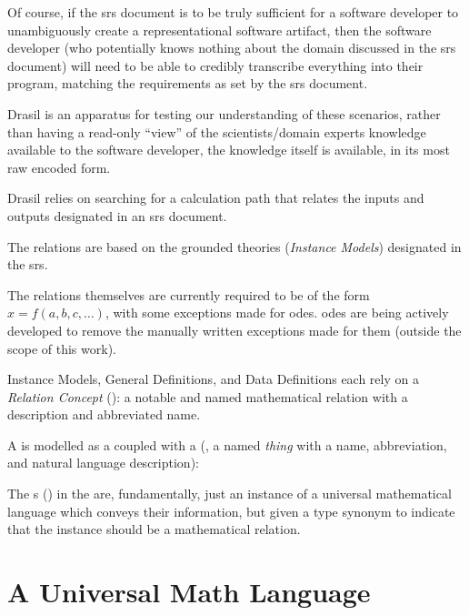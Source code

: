 Of course, if the \acs{srs} document is to be truly sufficient for a software
developer to unambiguously create a representational software artifact, then the
software developer (who potentially knows nothing about the domain discussed in
the \acs{srs} document) will need to be able to credibly transcribe everything
into their program, matching the requirements as set by the \acs{srs} document.

Drasil is an apparatus for testing our understanding of these scenarios, rather
than having a read-only ``view'' of the scientists/domain experts knowledge
available to the software developer, the knowledge itself is available, in its
most raw encoded form.




Drasil relies on searching for a calculation path that relates the inputs and
outputs designated in an \acs{srs} document.

The relations are based on the grounded theories (\textit{Instance Models})
designated in the \acs{srs}.

The relations themselves are currently required to be of the form \(x = f(a, b,
c, \ldots{})\), with some exceptions made for \acsp{ode}. \acsp{ode} are being
actively developed to remove the manually written exceptions made for them
(outside the scope of this work).




Instance Models, General Definitions, and Data Definitions each rely on a
\textit{Relation Concept} (\RelationConcept{}): a notable and named mathematical
relation with a description and abbreviated name.

A \RelationConcept{} is modelled as a \Relation{} coupled with a \ConceptChunk{}
(, a named \textit{thing} with a name,
abbreviation, and natural language description):

\originalRelationConcept{}

The \Relation{}s () in the \RelationConcept{} are,
fundamentally, just an instance of a universal mathematical language which
conveys their information, but given a type synonym to indicate that the
instance should be a mathematical relation.





\section{A Universal Math Language}
\label{sec:modelkinds:language}




